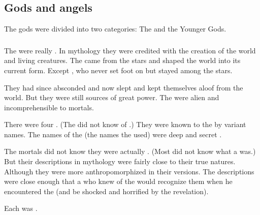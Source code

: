 \subsection{Gods and angels}
The \rethyax gods were divided into two categories: 
The \Primordials and the Younger Gods. 





\subsubsection{\Primordials}
The \Primordials were really \xss.
In \Ortaican mythology they were credited with the creation of the world and living creatures.
The \Primordials came from the stars and shaped the world into its current form. 
Except \Nelxurra, who never set foot on \Miith but stayed among the stars. 

They had since absconded and now slept and kept themselves aloof from the world. 
But they were still sources of great power. 
The \Primordials were alien and incomprehensible to mortals. 

There were four \Primordials.
(The \Ortaicans did not know of .)
They were known to the \Ortaicans by variant names.
The  names of the \Primordials (the names the \dragons used) were deep and secret \arcana.

The mortals did not know they were actually \xss. 
(Most \rethyaxes did not know what a \quo{\xs} was.)
But their descriptions in \Ortaican mythology were fairly close to their true natures. 
Although they were more anthropomorphized in their \Ortaican versions.
The descriptions were close enough that a \rethyax who knew of the \Primordials would recognize them when he encountered the \xss (and be shocked and horrified by the revelation). 

Each \Primordial was . 




